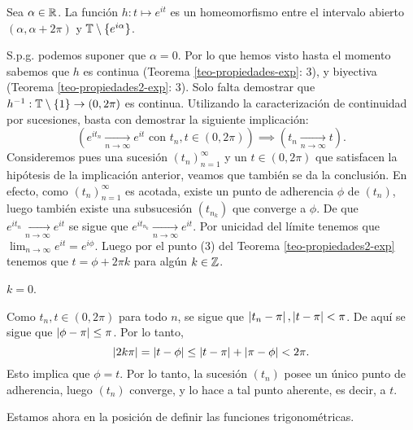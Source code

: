 \begin{theo}
    Sea \(\alpha \in \mathbb{R}\). La función \(h: t \mapsto e^{it}\) es un homeomorfismo entre el intervalo abierto \((\alpha, \alpha + 2\pi)\) y 
    \(\mathbb{T} \setminus \{e^{i\alpha}\}\).
\end{theo}
\begin{dem}
    S.p.g. podemos suponer que \(\alpha = 0\). Por lo que hemos visto hasta el momento sabemos que \(h\) es continua (Teorema \ref{teo-propiedades-exp}: 3), 
    y biyectiva (Teorema \ref{teo-propiedades2-exp}: 3). Solo falta demostrar que \(h^{-1} : \mathbb{T}\setminus \{1\} \rightarrow (0, 2\pi)\) es continua. 
    Utilizando la caracterización de continuidad por sucesiones, basta con demostrar la siguiente implicación:
    \[
        \left(e^{it_n}\xrightarrow[n\to \infty]{} e^{it}\,\, \text{con } t_n, t \in (0, 2\pi)\right) \implies (t_n \xrightarrow[n\to \infty]{} t).
    \]
    Consideremos pues una sucesión \((t_n)_{n=1}^{\infty}\) y un \(t\in (0,2\pi)\) que satisfacen la hipótesis de la implicación anterior, 
    veamos que también se da la conclusión. En efecto, como \((t_n)_{n=1}^{\infty}\) es acotada, existe un punto de adherencia \(\phi\) de \((t_n)\), 
    luego también existe una subsucesión \((t_{n_k})\) que converge a \(\phi\). De que \(e^{it_n}\xrightarrow[n\to \infty]{} e^{it}\) se sigue que 
    \(e^{it_{n_k}}\xrightarrow[n\to \infty]{} e^{it}\). Por unicidad del límite tenemos que \(\lim_{n \to \infty}e^{it} = e^{i\phi} \). Luego por el 
    punto (3) del Teorema \ref{teo-propiedades2-exp} tenemos que \(t= \phi + 2\pi k\) para algún \(k\in \mathbb{Z}\). 
    \begin{pd}
    \(k=0\).
    \end{pd}
    Como \(t_n, t \in (0, 2 \pi )\) para todo \(n\), se sigue que \(\left\lvert t_n - \pi\right\rvert, \left\lvert t - \pi\right\rvert < \pi\). De aquí se sigue que \(\left\lvert\phi - \pi\right\rvert\leq \pi\). Por lo tanto,
    \[
    \left\lvert2k\pi\right\rvert = \left\lvert t - \phi\right\rvert \leq \left\lvert t-\pi\right\rvert + \left\lvert\pi - \phi\right\rvert< 2\pi.
    \]
    Esto implica que \(\phi = t\). Por lo tanto, la sucesión \((t_n)\) posee un único punto de adherencia, luego \((t_n)\) converge, y lo hace a tal punto aherente, es decir,
    a \(t\).
\end{dem}

Estamos ahora en la posición de definir las funciones trigonométricas. 

